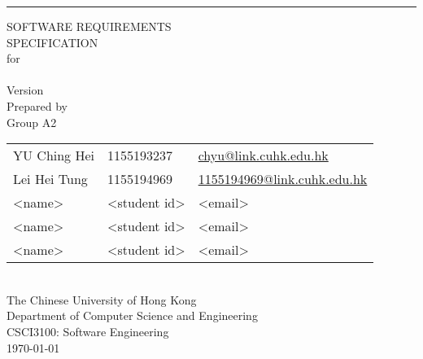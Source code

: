 \documentclass[a4paper, 11pt]{scrreprt}
\begin{document}

\begin{titlepage}
    \begin{flushright}
        \rule{\textwidth}{5pt}\vskip1cm
        \begin{bfseries}
            \Huge{SOFTWARE REQUIREMENTS\\ SPECIFICATION}\\
            \vspace{1.6cm}
            for\\
            \vspace{1.6cm}
            \projectname\\  %
            \vspace{1.6cm}
            \LARGE{Version \myversion}\\
            \vspace{1.6cm}
            Prepared by\\
            Group A2\\
            \begin{tabularx}{\textwidth}{l l >{\raggedleft\arraybackslash}X}
            YU Ching Hei & 1155193237 & \href{mailto:chyu@link.cuhk.edu.hk}{chyu@link.cuhk.edu.hk}\\
            Lei Hei Tung & 1155194969 & \href{mailto:1155194969@link.cuhk.edu.hk}{1155194969@link.cuhk.edu.hk}\\
            <name> & <student id> & <email>\\
            <name> & <student id> & <email>\\
            <name> & <student id> & <email>\\
            \end{tabularx}\\
            \vspace{1.6cm}
            The Chinese University of Hong Kong\\
            Department of Computer Science and Engineering\\
            CSCI3100: Software Engineering\\
            \vspace{1.6cm}
            \today\\
        \end{bfseries}
    \end{flushright}
\end{titlepage}

\tableofcontents
\end{document}
